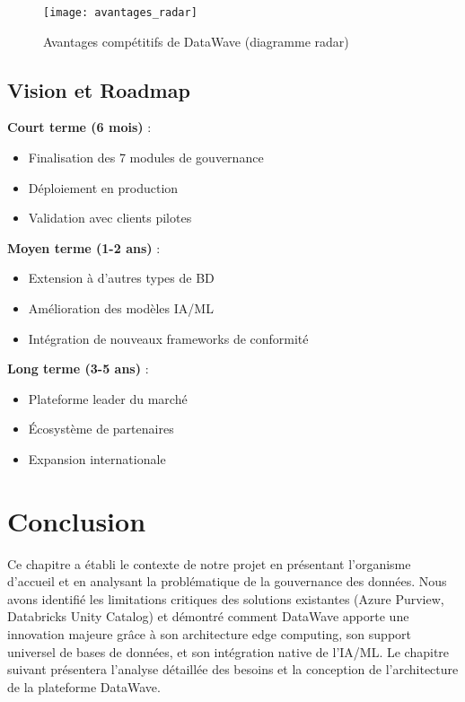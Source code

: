 \begin{figure}[htpb]
\centering
\texttt{[image: avantages\_radar]}
\caption{Avantages compétitifs de DataWave (diagramme radar)}
\label{fig:avantages_radar}
\end{figure}

\subsection{Vision et Roadmap}

\textbf{Court terme (6 mois)} :
\begin{itemize}
    \item Finalisation des 7 modules de gouvernance
    \item Déploiement en production
    \item Validation avec clients pilotes
\end{itemize}

\textbf{Moyen terme (1-2 ans)} :
\begin{itemize}
    \item Extension à d'autres types de BD
    \item Amélioration des modèles IA/ML
    \item Intégration de nouveaux frameworks de conformité
\end{itemize}

\textbf{Long terme (3-5 ans)} :
\begin{itemize}
    \item Plateforme leader du marché
    \item Écosystème de partenaires
    \item Expansion internationale
\end{itemize}

\section*{Conclusion}

Ce chapitre a établi le contexte de notre projet en présentant l'organisme d'accueil et en analysant la problématique de la gouvernance des données. Nous avons identifié les limitations critiques des solutions existantes (Azure Purview, Databricks Unity Catalog) et démontré comment DataWave apporte une innovation majeure grâce à son architecture edge computing, son support universel de bases de données, et son intégration native de l'IA/ML. Le chapitre suivant présentera l'analyse détaillée des besoins et la conception de l'architecture de la plateforme DataWave.
